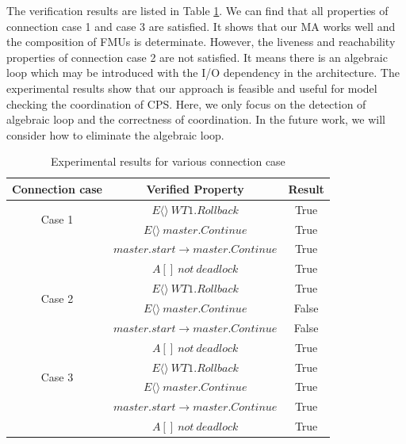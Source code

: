 The verification results are listed in Table \ref{rs}. We can find that all properties of connection case 1 and case 3 are satisfied. It shows that our MA works well and the composition of FMUs is determinate. However, the liveness and reachability properties of connection case 2 are not satisfied. It means there is an algebraic loop which may be introduced with the I/O dependency in the architecture. The experimental results show that our approach is feasible and useful for model checking the coordination of CPS. Here, we only focus on the detection of algebraic loop and the correctness of coordination. In the future work, we will consider how to eliminate the algebraic loop.  
\begin{table}
\caption{Experimental results for various connection case}
\centering
\begin{tabular}{c c c} 
        \hline  
        Connection case & Verified Property & Result\\
        \hline
        \multirow{2}{2.0cm}{Case 1}  
                & $E\langle\rangle~WT1.Rollback$ & True\\ 
                & $E\langle\rangle~master.Continue$ & True\\ 
                & $master.start\rightarrow master.Continue$ & True\\ 
                & $A[]~not~deadlock$ & True\\   
        \hline 
        \multirow{2}{2.0cm}{Case 2}  
                & $E\langle\rangle~WT1.Rollback$ & True\\ 
                & $E\langle\rangle~master.Continue$ & False\\ 
                & $master.start\rightarrow master.Continue$ & False\\ 
                & $A[]~not~deadlock$ & True\\   
        \hline 
        \multirow{2}{2.0cm}{Case 3}  
                & $E\langle\rangle~WT1.Rollback$ & True\\ 
                & $E\langle\rangle~master.Continue$ & True\\ 
                & $master.start \rightarrow master.Continue$ & True\\ 
                & $A[]~not~deadlock$ & True\\   
        \hline 
\end{tabular} 
\label{rs}
\end{table}




